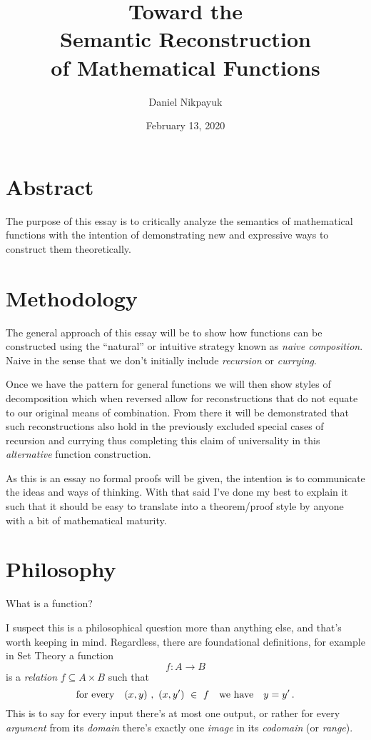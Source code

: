 \documentclass[twoside]{article}
\title{Toward the\\Semantic Reconstruction\\of Mathematical Functions}
\author{Daniel Nikpayuk}
\date{February 13, 2020}
\begin{document}
\maketitle
\thispagestyle{empty}

\section*{Abstract}

The purpose of this essay is to critically analyze the semantics of mathematical functions
with the intention of demonstrating new and expressive ways to construct them theoretically.

\section*{Methodology}

The general approach of this essay will be to show how functions can be constructed using the ``natural''
or intuitive strategy known as \emph{naive composition}. Naive in the sense that we don't initially include
\emph{recursion} or \emph{currying}.

Once we have the pattern for general functions we will then show styles of decomposition which when reversed
allow for reconstructions that do not equate to our original means of combination. From there it will be
demonstrated that such reconstructions also hold in the previously excluded special cases of recursion
and currying thus completing this claim of universality in this \emph{alternative} function construction.

As this is an essay no formal proofs will be given, the intention is to communicate the ideas and ways
of thinking. With that said I've done my best to explain it such that it should be easy to translate
into a theorem/proof style by anyone with a bit of mathematical maturity.

\section*{Philosophy}

What is a function?

I suspect this is a philosophical question more than anything else, and that's worth keeping
in mind. Regardless, there are foundational definitions, for example in Set Theory a function
$$ f : A \to B $$
is a \emph{relation} $ f \subseteq A \times B $ such that
$$ \mbox{for every} \quad (x,y)\ ,\ (x,y')\ \in\ f \quad \mbox{we have} \quad y = y' \mbox{\,.} $$
This is to say for every input there's at most one output, or rather for every \emph{argument} from its \emph{domain}
there's exactly one \emph{image} in its \emph{codomain} (or \emph{range}).
\end{document}
